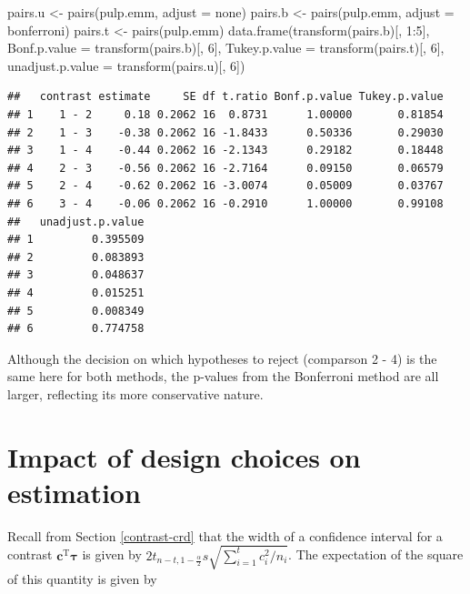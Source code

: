 \documentclass[
]{book}
\newenvironment{Shaded}{\begin{snugshade}}{\end{snugshade}}
\newcommand{\AttributeTok}[1]{\textcolor[rgb]{0.77,0.63,0.00}{#1}}
\newcommand{\DecValTok}[1]{\textcolor[rgb]{0.00,0.00,0.81}{#1}}
\newcommand{\FunctionTok}[1]{\textcolor[rgb]{0.00,0.00,0.00}{#1}}
\newcommand{\NormalTok}[1]{#1}
\newcommand{\OtherTok}[1]{\textcolor[rgb]{0.56,0.35,0.01}{#1}}
\newcommand{\SpecialCharTok}[1]{\textcolor[rgb]{0.00,0.00,0.00}{#1}}
\newcommand{\StringTok}[1]{\textcolor[rgb]{0.31,0.60,0.02}{#1}}
\theoremstyle{definition}
\theoremstyle{definition}
\theoremstyle{definition}
\theoremstyle{definition}
\theoremstyle{remark}
\begin{document}
\begin{Shaded}
\begin{Highlighting}[]
\NormalTok{pairs.u }\OtherTok{\textless{}{-}} \FunctionTok{pairs}\NormalTok{(pulp.emm, }\AttributeTok{adjust =} \StringTok{\textquotesingle{}none\textquotesingle{}}\NormalTok{)}
\NormalTok{pairs.b }\OtherTok{\textless{}{-}} \FunctionTok{pairs}\NormalTok{(pulp.emm, }\AttributeTok{adjust =} \StringTok{\textquotesingle{}bonferroni\textquotesingle{}}\NormalTok{)}
\NormalTok{pairs.t }\OtherTok{\textless{}{-}} \FunctionTok{pairs}\NormalTok{(pulp.emm)}
\FunctionTok{data.frame}\NormalTok{(}\FunctionTok{transform}\NormalTok{(pairs.b)[, }\DecValTok{1}\SpecialCharTok{:}\DecValTok{5}\NormalTok{], }\AttributeTok{Bonf.p.value =} \FunctionTok{transform}\NormalTok{(pairs.b)[, }\DecValTok{6}\NormalTok{], }\AttributeTok{Tukey.p.value =} \FunctionTok{transform}\NormalTok{(pairs.t)[, }\DecValTok{6}\NormalTok{], }\AttributeTok{unadjust.p.value =} \FunctionTok{transform}\NormalTok{(pairs.u)[, }\DecValTok{6}\NormalTok{])}
\end{Highlighting}
\end{Shaded}

\begin{verbatim}
##   contrast estimate     SE df t.ratio Bonf.p.value Tukey.p.value
## 1    1 - 2     0.18 0.2062 16  0.8731      1.00000       0.81854
## 2    1 - 3    -0.38 0.2062 16 -1.8433      0.50336       0.29030
## 3    1 - 4    -0.44 0.2062 16 -2.1343      0.29182       0.18448
## 4    2 - 3    -0.56 0.2062 16 -2.7164      0.09150       0.06579
## 5    2 - 4    -0.62 0.2062 16 -3.0074      0.05009       0.03767
## 6    3 - 4    -0.06 0.2062 16 -0.2910      1.00000       0.99108
##   unadjust.p.value
## 1         0.395509
## 2         0.083893
## 3         0.048637
## 4         0.015251
## 5         0.008349
## 6         0.774758
\end{verbatim}

Although the decision on which hypotheses to reject (comparson 2 - 4) is the same here for both methods, the p-values from the Bonferroni method are all larger, reflecting its more conservative nature.

\hypertarget{impact-of-design-choices-on-estimation}{%
\section{Impact of design choices on estimation}\label{impact-of-design-choices-on-estimation}}

Recall from Section \ref{contrast-crd} that the width of a confidence interval for a contrast \(\boldsymbol{c}^{\mathrm{T}}\boldsymbol{\tau}\) is given by \(2t_{n-t, 1-\frac{\alpha}{2}}s\sqrt{\sum_{i=1}^tc_i^2/n_i}\). The expectation of the square of this quantity is given by
\end{document}
